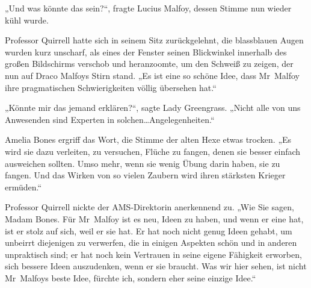 „Und was könnte das sein?“, fragte Lucius Malfoy, dessen Stimme nun wieder kühl wurde.

Professor Quirrell hatte sich in seinem Sitz zurückgelehnt, die blassblauen Augen wurden kurz unscharf, als eines der Fenster seinen Blickwinkel innerhalb des großen Bildschirms verschob und heranzoomte, um den Schweiß zu zeigen, der nun auf Draco Malfoys Stirn stand. „Es ist eine so schöne Idee, dass Mr~Malfoy ihre pragmatischen Schwierigkeiten völlig übersehen hat.“

„Könnte mir das jemand erklären?“, sagte Lady Greengrass. „Nicht alle von uns Anwesenden sind Experten in solchen…Angelegenheiten.“

Amelia Bones ergriff das Wort, die Stimme der alten Hexe etwas trocken. „Es wird sie dazu verleiten, zu versuchen, Flüche zu fangen, denen sie besser einfach ausweichen sollten. Umso mehr, wenn sie wenig Übung darin haben, sie zu fangen. Und das Wirken von so vielen Zaubern wird ihren stärksten Krieger ermüden.“

Professor Quirrell nickte der AMS-Direktorin anerkennend zu. „Wie Sie sagen, Madam Bones. Für Mr~Malfoy ist es neu, Ideen zu haben, und wenn er eine hat, ist er stolz auf sich, weil er sie hat. Er hat noch nicht genug Ideen gehabt, um unbeirrt diejenigen zu verwerfen, die in einigen Aspekten schön und in anderen unpraktisch sind; er hat noch kein Vertrauen in seine eigene Fähigkeit erworben, sich bessere Ideen auszudenken, wenn er sie braucht. Was wir hier sehen, ist nicht Mr~Malfoys beste Idee, fürchte ich, sondern eher seine einzige Idee.“

